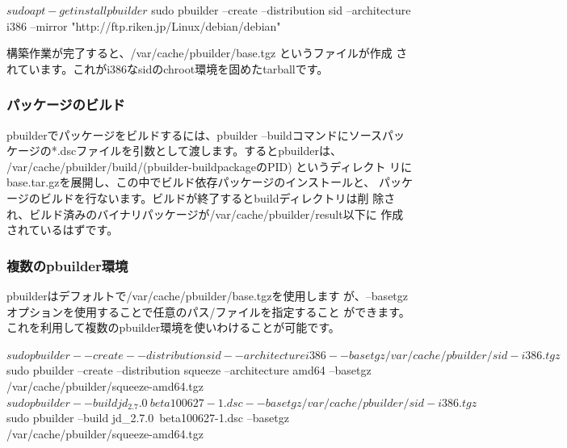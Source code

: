 \documentclass[mingoth,a4paper]{jsarticle}
\begin{document}
\begin{commandline}
$ sudo apt-get install pbuilder
$ sudo pbuilder --create --distribution sid --architecture i386 --mirror "http://ftp.riken.jp/Linux/debian/debian"
\end{commandline}

構築作業が完了すると、/var/cache/pbuilder/base.tgz というファイルが作成
されています。これがi386なsidのchroot環境を固めたtarballです。

\subsubsection{パッケージのビルド}

pbuilderでパッケージをビルドするには、pbuilder --buildコマンドにソースパッ
ケージの*.dscファイルを引数として渡します。するとpbuilderは、
/var/cache/pbuilder/build/(pbuilder-buildpackageのPID) というディレクト
リにbase.tar.gzを展開し、この中でビルド依存パッケージのインストールと、
パッケージのビルドを行ないます。ビルドが終了するとbuildディレクトリは削
除され、ビルド済みのバイナリパッケージが/var/cache/pbuilder/result以下に
作成されているはずです。


\subsubsection{複数のpbuilder環境}

pbuilderはデフォルトで/var/cache/pbuilder/base.tgzを使用します
が、--basetgzオプションを使用することで任意のパス/ファイルを指定すること
ができます。これを利用して複数のpbuilder環境を使いわけることが可能です。

\begin{commandline}
$ sudo pbuilder --create --distribution sid --architecture i386 --basetgz /var/cache/pbuilder/sid-i386.tgz
$ sudo pbuilder --create --distribution squeeze --architecture amd64 --basetgz /var/cache/pbuilder/squeeze-amd64.tgz
$ sudo pbuilder --build jd_2.7.0~beta100627-1.dsc --basetgz /var/cache/pbuilder/sid-i386.tgz
$ sudo pbuilder --build jd_2.7.0~beta100627-1.dsc --basetgz /var/cache/pbuilder/squeeze-amd64.tgz
\end{commandline}
\end{document}

